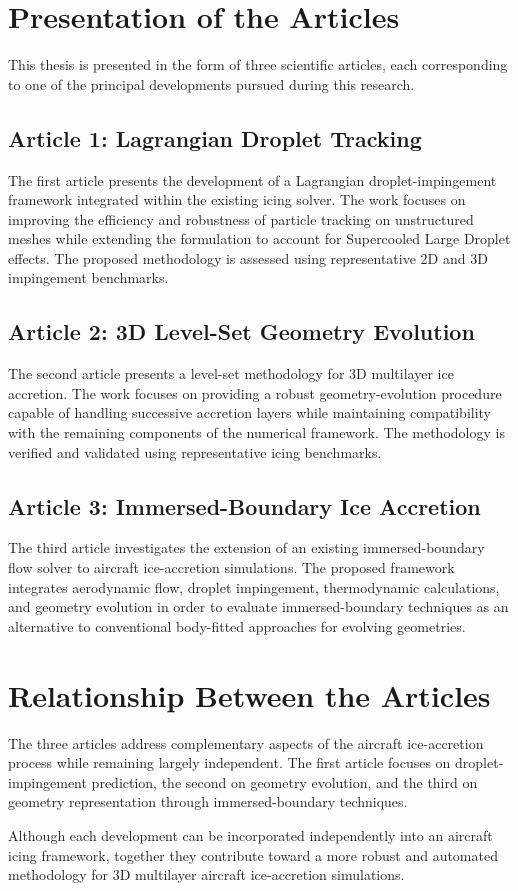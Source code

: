 \section{Presentation of the Articles}
\label{sec:articlePresentation}

This thesis is presented in the form of three scientific articles, each corresponding to one of the principal developments pursued during this research.

\subsection{Article 1: Lagrangian Droplet Tracking}

The first article presents the development of a Lagrangian droplet-impingement framework integrated within the existing icing solver. The work focuses on improving the efficiency and robustness of particle tracking on unstructured meshes while extending the formulation to account for Supercooled Large Droplet effects. The proposed methodology is assessed using representative 2D and 3D impingement benchmarks.

\subsection{Article 2: 3D Level-Set Geometry Evolution}

The second article presents a level-set methodology for 3D multilayer ice accretion. The work focuses on providing a robust geometry-evolution procedure capable of handling successive accretion layers while maintaining compatibility with the remaining components of the numerical framework. The methodology is verified and validated using representative icing benchmarks.

\subsection{Article 3: Immersed-Boundary Ice Accretion}

The third article investigates the extension of an existing immersed-boundary flow solver to aircraft ice-accretion simulations. The proposed framework integrates aerodynamic flow, droplet impingement, thermodynamic calculations, and geometry evolution in order to evaluate immersed-boundary techniques as an alternative to conventional body-fitted approaches for evolving geometries.

\section{Relationship Between the Articles}
\label{sec:articleRelationship}

The three articles address complementary aspects of the aircraft ice-accretion process while remaining largely independent. The first article focuses on droplet-impingement prediction, the second on geometry evolution, and the third on geometry representation through immersed-boundary techniques.

Although each development can be incorporated independently into an aircraft icing framework, together they contribute toward a more robust and automated methodology for 3D multilayer aircraft ice-accretion simulations.
